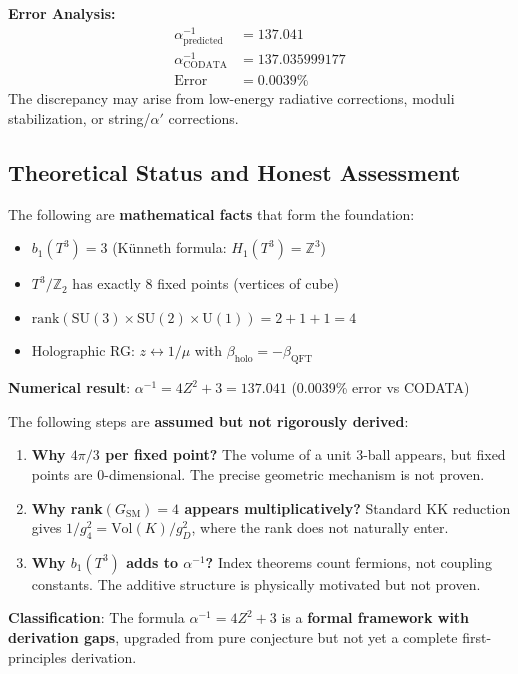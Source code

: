 \documentclass[12pt,a4paper]{article}
\newcommand{\Zsq}{Z^2}
\begin{document}
\textbf{Error Analysis:}
\begin{align}
\alpha^{-1}_{\text{predicted}} &= 137.041 \\
\alpha^{-1}_{\text{CODATA}} &= 137.035999177 \\
\text{Error} &= 0.0039\%
\end{align}
The discrepancy may arise from low-energy radiative corrections, moduli stabilization, or string/$\alpha'$ corrections.

\subsection{Theoretical Status and Honest Assessment}

\begin{tcolorbox}[colback=green!10!white, colframe=green!60!black, title=What Is Established]
The following are \textbf{mathematical facts} that form the foundation:
\begin{itemize}[itemsep=0pt]
    \item[\checkmark] $b_1(T^3) = 3$ (K\"unneth formula: $H_1(T^3) = \mathbb{Z}^3$)
    \item[\checkmark] $T^3/\mathbb{Z}_2$ has exactly 8 fixed points (vertices of cube)
    \item[\checkmark] $\text{rank}(\text{SU}(3) \times \text{SU}(2) \times \text{U}(1)) = 2 + 1 + 1 = 4$
    \item[\checkmark] Holographic RG: $z \leftrightarrow 1/\mu$ with $\beta_{\text{holo}} = -\beta_{\text{QFT}}$
\end{itemize}
\textbf{Numerical result}: $\alpha^{-1} = 4\Zsq + 3 = 137.041$ (0.0039\% error vs CODATA)
\end{tcolorbox}

\begin{tcolorbox}[colback=yellow!10!white, colframe=orange!75!black, title=Open Derivation Gaps (Honest Assessment)]
The following steps are \textbf{assumed but not rigorously derived}:
\begin{enumerate}[itemsep=0pt]
    \item \textbf{Why $4\pi/3$ per fixed point?} The volume of a unit 3-ball appears, but fixed points are 0-dimensional. The precise geometric mechanism is not proven.
    \item \textbf{Why rank$(G_{\text{SM}}) = 4$ appears multiplicatively?} Standard KK reduction gives $1/g_4^2 = \text{Vol}(K)/g_D^2$, where the rank does not naturally enter.
    \item \textbf{Why $b_1(T^3)$ adds to $\alpha^{-1}$?} Index theorems count fermions, not coupling constants. The additive structure is physically motivated but not proven.
\end{enumerate}

\textbf{Classification}: The formula $\alpha^{-1} = 4\Zsq + 3$ is a \textbf{formal framework with derivation gaps}, upgraded from pure conjecture but not yet a complete first-principles derivation.
\end{tcolorbox}
\end{document}

